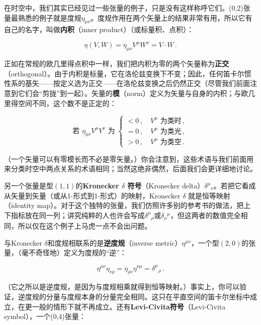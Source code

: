 在时空中，我们其实已经见过一些张量的例子，只是没有这样称呼它们。(0,2)张量最熟悉的例子就是度规$\eta_{\mu\nu}$。度规作用在两个矢量上的结果非常有用，所以它有自己的名字，叫做\textbf{内积}（inner product）（或标量积、点积）：

\begin{equation*}
\eta(V,W)=\eta_{\mu\nu}V^{\mu}W^{\nu}=V\cdot W\,.
\tag{1.66}
\end{equation*}

正如在常规的欧几里得点积中一样，我们把内积为零的两个矢量称为\textbf{正交}（orthogonal）。由于内积是标量，它在洛伦兹变换下不变；因此，任何笛卡尔惯性系的基矢——按定义选为正交——在洛伦兹变换之后仍然正交（尽管我们前面注意到它们会“剪拢”到一起）。矢量的\textbf{模}（norm）定义为矢量与自身的内积；与欧几里得空间不同，这个数不是正定的：

\begin{equation*}
\text{若 }\eta_{\mu\nu}V^{\mu}V^{\nu}\text{ 为}\;
\begin{cases}
<0\,, & \ V^{\mu}\text{ 为类时}\,,\\
=0\,, & \ V^{\mu}\text{ 为类光}\,,\\
>0\,, & \ V^{\mu}\text{ 为类空}\,.
\end{cases}
\end{equation*}

（一个矢量可以有零模长而不必是零矢量。）你会注意到，这些术语与我们前面用来分类时空中两点关系的术语相同；当然这绝非偶然，后面我们会更详细地讨论。

另一个张量是型$(1,1)$的\textbf{Kronecker $\delta$ 符号}（Kronecker delta）$\delta^{\mu}{}_{\nu}$。若把它看成从矢量到矢量（或从1-形式到1-形式）的映射，Kronecker $\delta$ 就是恒等映射（identity map）。对于这个独特的张量，我们仿照许多别的参考书的做法，把上下指标放在同一列；讲究纯粹的人也许会写成$\delta^{\mu}{}_{\rho}$或$\delta_{\rho}{}^{\mu}$，但这两者的数值完全相同，所以仅在这个例子上马虎一点不会出问题。

与Kronecker $\delta$和度规相联系的是\textbf{逆度规}（inverse metric）$\eta^{\mu\nu}$，一个型$(2,0)$的张量，（毫不奇怪地）定义为度规的“逆”：

\begin{equation*}
\eta^{\mu\nu}\eta_{\nu\rho}=\eta_{\rho\nu}\eta^{\nu\mu}=\delta^{\mu}{}_{\rho}\,.
\tag{1.67}
\end{equation*}

（它之所以是逆度规，是因为与度规相乘就得到恒等映射。）事实上，你可以验证，逆度规的分量与度规本身的分量完全相同。这只在平直空间的笛卡尔坐标中成立，在更一般的情形下就不再成立。还有\textbf{Levi-Civita符号}（Levi-Civita symbol），一个(0,4)张量：

